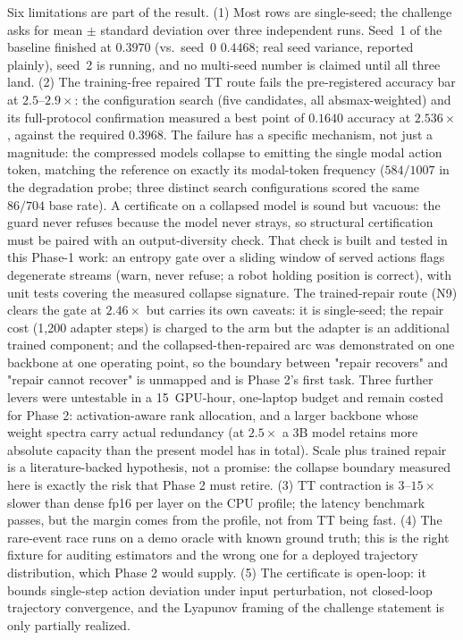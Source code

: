 \documentclass[conference,10pt]{IEEEtran}
\begin{document}
Six limitations are part of the result. (1) Most rows are single-seed; the
challenge asks for mean $\pm$ standard deviation over three independent
runs. Seed~1 of the baseline finished at $0.3970$ (vs.\ seed~0 $0.4468$;
real seed variance, reported plainly), seed~2 is running, and no multi-seed
number is claimed until all three land. (2) The training-free repaired TT route fails the
pre-registered accuracy bar at $2.5$--$2.9\times$: the configuration search
(five candidates, all absmax-weighted) and its full-protocol confirmation
measured a best point of $0.1640$ accuracy at $2.536\times$, against the
required $0.3968$. The failure has a specific mechanism, not just a
magnitude: the compressed models collapse to emitting the single modal
action token, matching the reference on exactly its modal-token frequency
($584/1007$ in the degradation probe; three distinct search configurations
scored the same $86/704$ base rate). A certificate on a collapsed model is
sound but vacuous: the guard never refuses because the model never strays,
so structural certification must be paired with an output-diversity
check. That check is built and tested in this Phase-1 work: an
entropy gate over a sliding window of served actions flags degenerate
streams (warn, never refuse; a robot holding position is correct),
with unit tests covering the measured collapse signature. The
trained-repair route (N9) clears the gate at $2.46\times$ but carries its
own caveats: it is single-seed; the repair cost (1{,}200 adapter steps) is
charged to the arm but the adapter is an additional trained component; and
the collapsed-then-repaired arc was demonstrated on one backbone at one
operating point, so the boundary between "repair recovers" and "repair
cannot recover" is unmapped and is Phase 2's first task. Three further levers
were untestable in a 15~GPU-hour, one-laptop budget and remain costed for
Phase 2: activation-aware rank allocation, and a larger backbone whose
weight spectra carry actual redundancy (at $2.5\times$ a 3B model retains
more absolute capacity than the present model has in total). Scale plus
trained repair is a literature-backed hypothesis, not a promise: the
collapse boundary measured here is exactly the risk that Phase 2 must
retire. (3) TT contraction is $3$--$15\times$
slower than dense fp16 per layer on the CPU profile; the latency benchmark
passes, but the margin comes from the profile, not from TT being fast.
(4) The rare-event race runs on a demo oracle with known ground truth;
this is the right fixture for auditing estimators and the wrong one for a
deployed trajectory distribution, which Phase 2 would supply. (5) The
certificate is open-loop: it bounds single-step action deviation under input
perturbation, not closed-loop trajectory convergence, and the Lyapunov
framing of the challenge statement is only partially realized.
\end{document}
